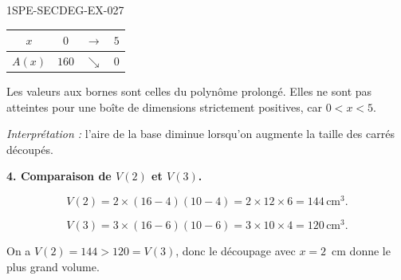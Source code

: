 \begin{corrige}{1SPE-SECDEG-EX-027}
\medskip
\begin{center}
\begin{tabular}{|c|ccc|}
\hline
$x$ & $0$ & $\rightarrow$ & $5$ \\
\hline
$A(x)$ & $160$ & $\searrow$ & $0$ \\
\hline
\end{tabular}
\end{center}

Les valeurs aux bornes sont celles du polynôme prolongé. Elles ne sont pas
atteintes pour une boîte de dimensions strictement positives, car $0<x<5$.

\textit{Interprétation :} l'aire de la base diminue lorsqu'on augmente la taille des carrés découpés.

\medskip
\textbf{4. Comparaison de $V(2)$ et $V(3)$.}


\[V(2) = 2 \times (16 - 4)(10 - 4) = 2 \times 12 \times 6 = 144\,\text{cm}^3.\]

\[V(3) = 3 \times (16 - 6)(10 - 6) = 3 \times 10 \times 4 = 120\,\text{cm}^3.\]

On a $V(2) = 144 > 120 = V(3)$, donc le découpage avec $x = 2$~cm donne le plus grand volume.

\end{corrige}

